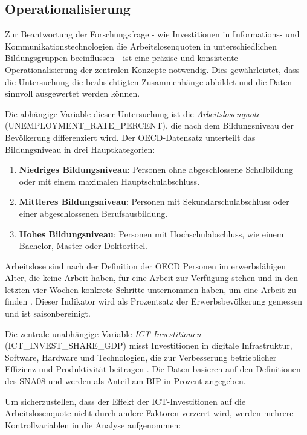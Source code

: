 
\subsection{Operationalisierung}

Zur Beantwortung der Forschungsfrage - wie Investitionen in Informations- und Kommunikationstechnologien 
die Arbeitslosenquoten in unterschiedlichen Bildungsgruppen beeinflussen - ist eine präzise und konsistente 
Operationalisierung der zentralen Konzepte notwendig. Dies gewährleistet, dass die Untersuchung die 
beabsichtigten Zusammenhänge abbildet und die Daten sinnvoll ausgewertet werden können.

Die abhängige Variable dieser Untersuchung ist die \textit{Arbeitslosenquote} (UNEMPLOYMENT\_RATE\_PERCENT), 
die nach dem Bildungsniveau der Bevölkerung differenziert wird. Der \ac{OECD}-Datensatz unterteilt das 
Bildungsniveau in drei Hauptkategorien:

\begin{enumerate}
    \item \textbf{Niedriges Bildungsniveau}: Personen ohne abgeschlossene Schulbildung oder mit einem 
    maximalen Hauptschulabschluss.
    \item \textbf{Mittleres Bildungsniveau}: Personen mit Sekundarschulabschluss oder einer abgeschlossenen 
    Berufsausbildung.
    \item \textbf{Hohes Bildungsniveau}: Personen mit Hochschulabschluss, wie einem Bachelor, Master oder 
    Doktortitel.
\end{enumerate}

Arbeitslose sind nach der Definition der \ac{OECD} Personen im erwerbsfähigen Alter, die keine Arbeit haben, 
für eine Arbeit zur Verfügung stehen und in den letzten vier Wochen konkrete Schritte unternommen haben, um 
eine Arbeit zu finden \parencite{oecd2022unemployment}. Dieser Indikator wird als Prozentsatz der 
Erwerbsbevölkerung gemessen und ist saisonbereinigt.

Die zentrale unabhängige Variable \textit{\ac{ICT}-Investitionen} (ICT\_INVEST\_SHARE\_GDP) misst Investitionen 
in digitale Infrastruktur, Software, Hardware und Technologien, die zur Verbesserung betrieblicher Effizienz 
und Produktivität beitragen \parencite{oecd2022ict}. Die Daten basieren auf den Definitionen des \ac{SNA08} 
und werden als Anteil am \ac{BIP} in Prozent angegeben.

Um sicherzustellen, dass der Effekt der \ac{ICT}-Investitionen auf die Arbeitslosenquote nicht durch andere 
Faktoren verzerrt wird, werden mehrere Kontrollvariablen in die Analyse aufgenommen:

